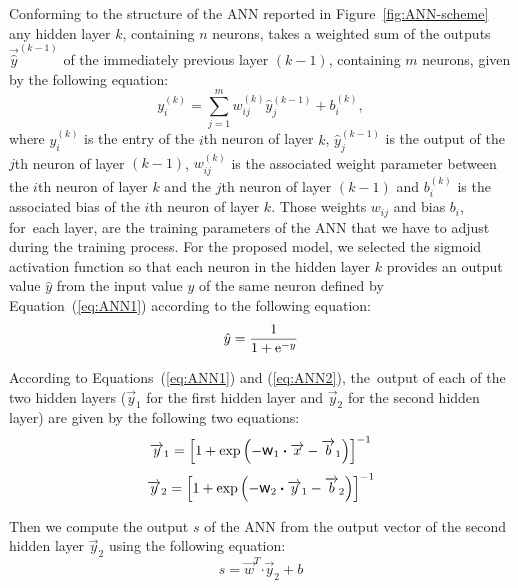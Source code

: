 \documentclass[algorithms,article,accept,pdftex,oneauthors]{Definitions/mdpi}
\DeclareRobustCommand{\w}{\mbox{\large\ensuremath{\mathsf{w}}}}
\DeclareRobustCommand{\dotp}{\boldsymbol{\cdot}}
\DeclareRobustCommand{\e}[1]{{\rm e}^{#1}}
\DeclareRobustCommand{\lay}[1]{^{(#1)}}
\begin{document}
Conforming to the structure of the ANN reported in Figure~\ref{fig:ANN-scheme} any hidden layer $k$, containing $n$ neurons, takes a weighted sum of the outputs $\overrightarrow{\hat{y}}^{(k-1)}$ of the immediately previous layer $(k-1)$, containing $m$ neurons, given by the following equation:
\begin{equation}
y_i\lay{k} = \sum_{j=1}^m w_{ij}\lay{k} \hat{y}_j^{(k-1)}+ b_i\lay{k},\label{eq:ANN1}
\end{equation}
where $y_i\lay{k}$ is the entry of the $i${{th}} %
 neuron of layer $k$, $\hat{y}_j\lay{k-1}$ is the output of the $j${{th}} neuron of layer $(k-1)$, $w_{ij}\lay{k}$ is the associated weight parameter between the $i${{th}} neuron of layer $k$ and the $j${{th}} neuron of layer $(k-1)$ and $b_i\lay{k}$ is the associated bias of the $i${{th}} neuron of layer $k$.
Those weights $w_{ij}$ and bias $b_i$, for~each layer, are the training parameters of the ANN that we have to adjust during the training process.
For the proposed model, we selected the sigmoid activation function so that each neuron in the hidden layer $k$ provides an output value ${\hat{y}}$ from the input value $y$ of the same neuron defined by Equation~(\ref{eq:ANN1}) according to the following equation:
\begin{equation}
\hat{y}=\frac{1}{1 + \e{-y}}\label{eq:ANN2}
\end{equation}

According to Equations~(\ref{eq:ANN1}) and (\ref{eq:ANN2}), the~output of each of the two hidden layers ($\overrightarrow{y}_1$ for the first hidden layer and $\overrightarrow{y}_2$ for the second hidden layer) are given by the following two equations:
\begin{equation}
\overrightarrow{y}_1 = \left[1 + \exp{\left(- \w_1 \dotp \overrightarrow{x}- \overrightarrow{b}_1\right)}\right]^{-1}\label{eq:ANN3}
\end{equation}
\begin{equation}
\overrightarrow{y}_2 = \left[1 + \exp{\left(- \w_2 \dotp \overrightarrow{y}_1- \overrightarrow{b}_2\right)}\right]^{-1}\label{eq:ANN4}
\end{equation}

{Then} %
 we compute the output $s$ of the ANN from the output vector of the second hidden layer $\overrightarrow{y}_2$ using the following equation:
\begin{equation}
s = \overrightarrow{w}^T \dotp \overrightarrow{y}_2 + b\label{eq:ANN5}
\end{equation}
\end{document}
